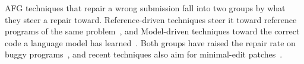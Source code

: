 \documentclass[conference]{IEEEtran}
\begin{document}
AFG techniques that repair a wrong submission fall into two groups by what they steer a repair toward. Reference-driven techniques steer it toward reference programs of the same problem~\cite{gulwani2018automated,hu2019re,choi2025automated,wang2018search,choi2021automated,xie2024brafar}, and Model-driven techniques toward the correct code a language model has learned~\cite{joshi2023repair,heo2023referent,zhang2024pydex,phung2023generating,liu2024fastfixer,yang2024cref,zhao2026peer,orvalho2025counterexample,dai2026learner}. Both groups have raised the repair rate on buggy programs~\cite{koutcheme2024benchmarking}, and recent techniques also aim for minimal-edit patches~\cite{choi2025automated,dai2026learner}.
\end{document}
